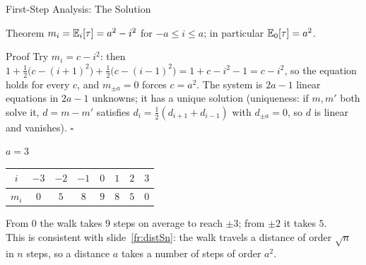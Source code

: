 \begin{frame}{First-Step Analysis: The Solution}
  \label{fr:exitsol}
  \small
  \begin{block}{Theorem}
    $m_i=\mathbb{E}_i[\tau]=a^2-i^2$ for $-a\le i\le a$; in particular $\mathbb{E}_0[\tau]=a^2$.
  \end{block}
  \begin{block}{Proof}
    Try $m_i=c-i^2$: then $1+\tfrac12\big(c-(i+1)^2\big)+\tfrac12\big(c-(i-1)^2\big)=1+c-i^2-1=c-i^2$, so the equation holds for every $c$, and $m_{\pm a}=0$ forces $c=a^2$.
    The system is $2a-1$ linear equations in $2a-1$ unknowns; it has a unique solution (uniqueness: if $m,m'$ both solve it, $d=m-m'$ satisfies $d_i=\tfrac12(d_{i+1}+d_{i-1})$ with $d_{\pm a}=0$, so $d$ is linear and vanishes). \hfill$\square$
  \end{block}
  \begin{exampleblock}{$a=3$}
    \begin{tabular}{@{}c|ccccccc@{}}
      $i$ & $-3$ & $-2$ & $-1$ & $0$ & $1$ & $2$ & $3$ \\ \hline
      $m_i$ & $0$ & $5$ & $8$ & $9$ & $8$ & $5$ & $0$
    \end{tabular}
    \par\smallskip
    From $0$ the walk takes $9$ steps on average to reach $\pm3$; from $\pm2$ it takes $5$.\\
    This is consistent with slide~\ref{fr:distSn}: the walk travels a distance of order $\sqrt n$ in $n$ steps, so a distance $a$ takes a number of steps of order $a^2$.
  \end{exampleblock}
\end{frame}


